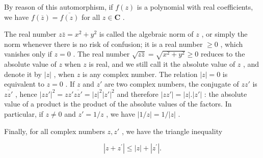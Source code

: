 By reason of this automorphism, if \(f(z)\) is a polynomial with real coefficients, we have \(f(\overline{z}) = \overline{f(z)}\) for all \(z \in \mathbf{C}\) .

The real number \(z\bar{z} = x^2 + y^2\) is called the algebraic norm of \(z\) , or simply the norm whenever there is no risk of confusion; it is a real number \(\geqslant 0\) , which vanishes only if \(z = 0\) . The real number \(\sqrt{z\bar{z}} = \sqrt{x^2 + y^2} \geqslant 0\) reduces to the absolute value of \(z\) when \(z\) is real, and we still call it the absolute value of \(z\) , and denote it by \(|z|\) , when \(z\) is any complex number. The relation \(|z| = 0\) is equivalent to \(z = 0\) . If \(z\) and \(z'\) are two complex numbers, the conjugate of \(zz'\) is \(\overline{zz'}\) , hence \(|zz'|^2 = zz' \overline{zz'} = |z|^2 |z'|^2\) and therefore \(|zz'| = |z|. |z'|\) : the absolute value of a product is the product of the absolute values of the factors. In particular, if \(z \neq 0\) and \(z' = 1/z\) , we have \(|1/z| = 1/|z|\) .

Finally, for all complex numbers \(z, z'\) , we have the triangle inequality

\[
\left| z + z ^ {\prime} \right| \leqslant | z | + \left| z ^ {\prime} \right|.\tag{4}
\]

